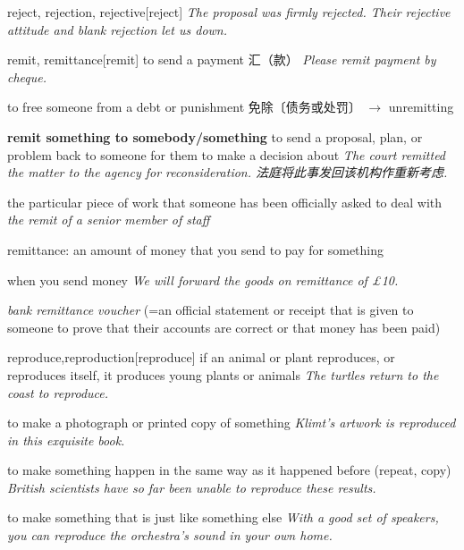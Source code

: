 \begin{DefWord}{reject, rejection, rejective}[reject]
    \textit{The proposal was firmly rejected. Their rejective attitude and blank rejection let us down.}
\end{DefWord}

\begin{DefWord}{remit, remittance}[remit]
    to send a payment 汇（款）
    \textit{Please remit payment by cheque.}

    to free someone from a debt or punishment 免除〔债务或处罚〕 $\rightarrow$  unremitting

    \textbf{remit something to somebody/something}
    to send a proposal, plan, or problem back to someone for them to make a decision about
    \textit{The court remitted the matter to the agency for reconsideration. 法庭将此事发回该机构作重新考虑. }

    the particular piece of work that someone has been officially asked to deal with
    \textit{the remit of a senior member of staff}

    remittance: an amount of money that you send to pay for something

    when you send money
    \textit{We will forward the goods on remittance of £10.}

    \textit{bank remittance voucher} (=an official statement or receipt that is given to someone to prove that their accounts are correct or that money has been paid)
\end{DefWord}


\begin{DefWord}{reproduce,reproduction}[reproduce]
    if an animal or plant reproduces, or reproduces itself, it produces young plants or animals
    \textit{The turtles return to the coast to reproduce.}

    to make a photograph or printed copy of something
    \textit{Klimt's artwork is reproduced in this exquisite book.}

    to make something happen in the same way as it happened before (repeat, copy)
    \textit{British scientists have so far been unable to reproduce these results.}

    to make something that is just like something else
    \textit{With a good set of speakers, you can reproduce the orchestra's sound in your own home.}
\end{DefWord}

